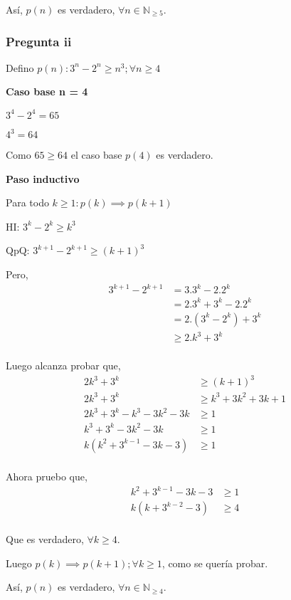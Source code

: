 Así, $p(n)$ es verdadero, $\forall n \in \mathbb{N}_{\geq 5}$.

\subsubsection{Pregunta ii}

Defino $ p(n): 3^n - 2^n \geq n^3; \forall n \geq 4 $

\textbf{Caso base n = 4}

$3^4 - 2^4 = 65$

$ 4^3 = 64$

Como $ 65 \geq 64 $ el caso base $p(4)$ es verdadero.

\textbf{Paso inductivo}

Para todo $k \geq 1: p(k) \implies p(k+1)$

HI: $3^k - 2^k \geq k^3$

QpQ: $ 3^{k+1} - 2^{k+1} \geq (k+1)^3$

Pero,
\begin{align*}
    3^{k+1} - 2^{k+1} &= 3.3^k - 2.2^k \\
    &= 2.3^k + 3^k - 2.2^k \\
    &= 2.(3^k - 2^k) + 3^k \\
    &\geq 2.k^3 + 3^k \\
\end{align*}

Luego alcanza probar que,
\begin{align*}
    2k^3 + 3^k &\geq (k+1)^3 \\
    2k^3 + 3^k &\geq k^3 + 3k^2 + 3k + 1 \\
    2k^3 + 3^k - k^3 - 3k^2 - 3k &\geq 1 \\
    k^3 + 3^k - 3k^2 - 3k &\geq 1 \\
    k(k^2 + 3^{k-1} - 3k -3) &\geq 1 \\
\end{align*}

Ahora pruebo que,
\begin{align*}
    k^2 + 3^{k-1} - 3k -3 &\geq 1 \\
    k(k + 3^{k-2} - 3) &\geq 4 \\
\end{align*}

Que es verdadero, $\forall k \geq 4$.

Luego $p(k) \implies p(k+1); \forall k \geq 1$, como se quería probar.

Así, $p(n)$ es verdadero, $\forall n \in \mathbb{N}_{\geq 4}$.

